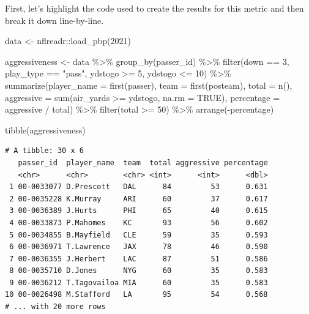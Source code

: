 \documentclass[
  letterpaper,
]{krantz}
\newenvironment{Shaded}{\begin{snugshade}}{\end{snugshade}}
\newcommand{\AttributeTok}[1]{\textcolor[rgb]{0.40,0.45,0.13}{#1}}
\newcommand{\ConstantTok}[1]{\textcolor[rgb]{0.56,0.35,0.01}{#1}}
\newcommand{\DecValTok}[1]{\textcolor[rgb]{0.68,0.00,0.00}{#1}}
\newcommand{\FunctionTok}[1]{\textcolor[rgb]{0.28,0.35,0.67}{#1}}
\newcommand{\NormalTok}[1]{\textcolor[rgb]{0.00,0.23,0.31}{#1}}
\newcommand{\OtherTok}[1]{\textcolor[rgb]{0.00,0.23,0.31}{#1}}
\newcommand{\SpecialCharTok}[1]{\textcolor[rgb]{0.37,0.37,0.37}{#1}}
\newcommand{\StringTok}[1]{\textcolor[rgb]{0.13,0.47,0.30}{#1}}
\begin{document}
First, let's highlight the code used to create the results for this
metric and then break it down line-by-line.

\begin{Shaded}
\begin{Highlighting}[]
\NormalTok{data }\OtherTok{\textless{}{-}}\NormalTok{ nflreadr}\SpecialCharTok{::}\FunctionTok{load\_pbp}\NormalTok{(}\DecValTok{2021}\NormalTok{)}

\NormalTok{aggressiveness }\OtherTok{\textless{}{-}}\NormalTok{ data }\SpecialCharTok{\%\textgreater{}\%}
  \FunctionTok{group\_by}\NormalTok{(passer\_id) }\SpecialCharTok{\%\textgreater{}\%}
  \FunctionTok{filter}\NormalTok{(down }\SpecialCharTok{==} \DecValTok{3}\NormalTok{, play\_type }\SpecialCharTok{==} \StringTok{"pass"}\NormalTok{, ydstogo }\SpecialCharTok{\textgreater{}=} \DecValTok{5}\NormalTok{, ydstogo }\SpecialCharTok{\textless{}=} \DecValTok{10}\NormalTok{) }\SpecialCharTok{\%\textgreater{}\%}
  \FunctionTok{summarize}\NormalTok{(}\AttributeTok{player\_name =} \FunctionTok{first}\NormalTok{(passer),}
            \AttributeTok{team =} \FunctionTok{first}\NormalTok{(posteam),}
            \AttributeTok{total =} \FunctionTok{n}\NormalTok{(),}
            \AttributeTok{aggressive =} \FunctionTok{sum}\NormalTok{(air\_yards }\SpecialCharTok{\textgreater{}=}\NormalTok{ ydstogo, }\AttributeTok{na.rm =} \ConstantTok{TRUE}\NormalTok{),}
            \AttributeTok{percentage =}\NormalTok{ aggressive }\SpecialCharTok{/}\NormalTok{ total) }\SpecialCharTok{\%\textgreater{}\%}
  \FunctionTok{filter}\NormalTok{(total }\SpecialCharTok{\textgreater{}=} \DecValTok{50}\NormalTok{) }\SpecialCharTok{\%\textgreater{}\%}
  \FunctionTok{arrange}\NormalTok{(}\SpecialCharTok{{-}}\NormalTok{percentage)}

\FunctionTok{tibble}\NormalTok{(aggressiveness)}
\end{Highlighting}
\end{Shaded}

\begin{verbatim}
# A tibble: 30 x 6
   passer_id  player_name  team  total aggressive percentage
   <chr>      <chr>        <chr> <int>      <int>      <dbl>
 1 00-0033077 D.Prescott   DAL      84         53      0.631
 2 00-0035228 K.Murray     ARI      60         37      0.617
 3 00-0036389 J.Hurts      PHI      65         40      0.615
 4 00-0033873 P.Mahomes    KC       93         56      0.602
 5 00-0034855 B.Mayfield   CLE      59         35      0.593
 6 00-0036971 T.Lawrence   JAX      78         46      0.590
 7 00-0036355 J.Herbert    LAC      87         51      0.586
 8 00-0035710 D.Jones      NYG      60         35      0.583
 9 00-0036212 T.Tagovailoa MIA      60         35      0.583
10 00-0026498 M.Stafford   LA       95         54      0.568
# ... with 20 more rows
\end{verbatim}
\end{document}
